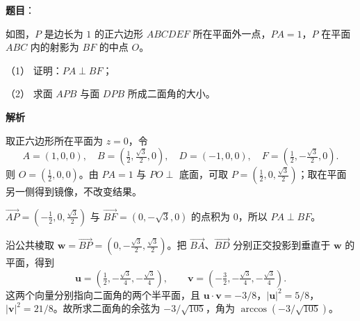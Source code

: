\begin{answer}

\textbf{题目}：

如图，$P$ 是边长为 $1$ 的正六边形 $ABCDEF$ 所在平面外一点，$PA=1$，$P$ 在平面 $ABC$ 内的射影为 $BF$ 的中点 $O$。

（1） 证明：$PA\perp BF$；

（2） 求面 $APB$ 与面 $DPB$ 所成二面角的大小。
\nopagebreak[4]
\begin{center}\end{center}
\nopagebreak[4]
\textbf{解析}

取正六边形所在平面为 $z=0$，令
\nopagebreak[4]
\[
A=(1,0,0),\quad B=(\tfrac12,\tfrac{\sqrt3}2,0),\quad
D=(-1,0,0),\quad F=(\tfrac12,-\tfrac{\sqrt3}2,0).
\]
则 $O=(\frac12,0,0)$。由 $PA=1$ 与 $PO\perp$ 底面，可取 $P=(\frac12,0,\frac{\sqrt3}2)$；取在平面另一侧得到镜像，不改变结果。


$\overrightarrow{AP}=(-\frac12,0,\frac{\sqrt3}2)$ 与 $\overrightarrow{BF}=(0,-\sqrt3,0)$ 的点积为 $0$，所以 $PA\perp BF$。


沿公共棱取 $\mathbf w=\overrightarrow{BP}=(0,-\frac{\sqrt3}2,\frac{\sqrt3}2)$。把 $\overrightarrow{BA}$、$\overrightarrow{BD}$ 分别正交投影到垂直于 $\mathbf w$ 的平面，得到
\nopagebreak[4]
\[
\mathbf u=(\tfrac12,-\tfrac{\sqrt3}4,-\tfrac{\sqrt3}4),\qquad
\mathbf v=(-\tfrac32,-\tfrac{\sqrt3}4,-\tfrac{\sqrt3}4).
\]
这两个向量分别指向二面角的两个半平面，且 $\mathbf u\cdot\mathbf v=-3/8$，$|\mathbf u|^2=5/8$，$|\mathbf v|^2=21/8$。故所求二面角的余弦为 $-3/\sqrt{105}$，角为 $\arccos(-3/\sqrt{105})$。



\end{answer}
